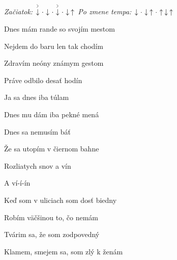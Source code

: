 \begin{song}


\begin{headerbox}
\RaiseBoxWithAccents
\textit{Začiatok:} $\AccentDown\Miss\Down\Miss\AccentDown\Miss\Down\Up$ \quad
\textit{Po zmene tempa:} $\Down\Miss\Down\Up\Miss\Up\Down\Up$ \quad
\end{headerbox}

\begin{vchordbox}
\end{vchordbox}

\large

\bigskip

 Dnes mám rande so svojím mestom \par
{} Nejdem do baru len tak chodím \par
{} Zdravím neóny známym gestom \par
{} Práve odbilo desať hodín \par

\bigskip

\begin{chorusbox}{\Refren}
 Ja sa dnes iba túlam \par
{} Dnes mu dám iba pekné mená \par
{} Dnes sa nemusím báť \par
{} Že sa utopím v čiernom bahne \par
{}Rozliatych snov  a vín  \par
A ví-í-ín  \par
\end{chorusbox}

\bigskip

 Keď som v uliciach som dosť biedny \par
{} Robím väčšinou to, čo nemám \par
{} Tvárim sa, že som zodpovedný \par
{} Klamem, smejem sa, som zlý k ženám \par

\bigskip

\Refren\  \par

\bigskip


\end{song}
